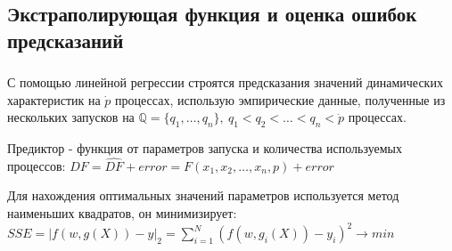 \documentclass[unicode, t]{beamer}%
\begin{document}
		\subsection{Экстраполирующая функция и оценка ошибок предсказаний}
			\begin{frame}
				\frametitle{\insertsection}
					\framesubtitle{\insertsubsection}
					С помощью линейной регрессии строятся предсказания значений динамических характеристик на \(\dot{p}\) процессах, использую эмпирические данные, полученные из нескольких запусков на \(\mathbb{Q} = \{q_1,\ldots, q_n\},\ q_1 < q_2 < \ldots < q_n < \dot{p}\) процессах.

					Предиктор - функция от параметров запуска и количества используемых процессов: \(\label{main_formula}DF = \hat{DF} + error = F(x_1, x_2, \ldots, x_n, p) + error\)

					Для нахождения оптимальных значений параметров используется метод наименьших квадратов, он минимизирует: \(SSE = |f(w, g(X)) - y|_2 = \sum_{i = 1}^{N}{(f(w, g_i(X)) - y_i)^2 \rightarrow min}\)
			\end{frame}
\end{document}
